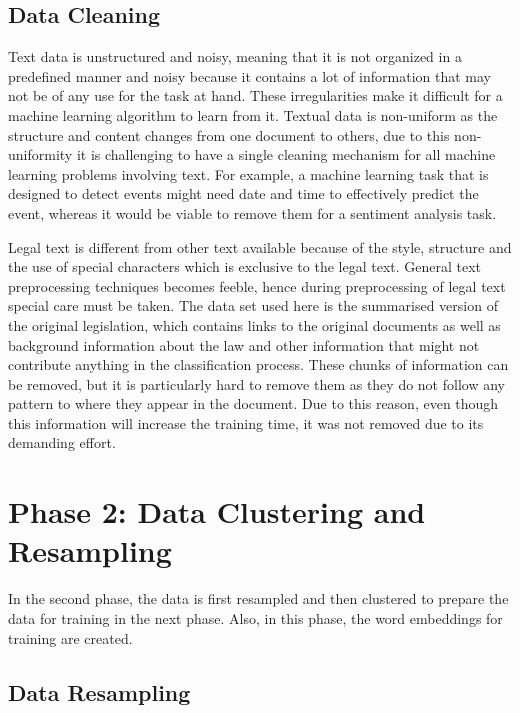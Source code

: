 \subsection*{Data Cleaning}\label{ConceptCleaning}

Text data is unstructured and noisy, meaning that it is not organized in a predefined manner and noisy because it contains a lot of information that may not be of any use for the task at hand. These irregularities make it difficult for a machine learning algorithm to learn from it. Textual data is non-uniform as the structure and content changes from one document to others, due to this non-uniformity it is challenging to have a single cleaning mechanism for all machine learning problems involving text. For example, a machine learning task that is designed to detect events might need date and time to effectively predict the event, whereas it would be viable to remove them for a sentiment analysis task.

Legal text is different from other text available because of the style, structure \cite{boella2011using} and the use of special characters which is exclusive to the legal text. General text preprocessing techniques becomes feeble, hence during preprocessing of legal text special care must be taken. The data set used here is the summarised version of the original legislation, which contains links to the original documents as well as background information about the law and other information that might not contribute anything in the classification process. These chunks of information can be removed, but it is particularly hard to remove them as they do not follow any pattern to where they appear in the document. Due to this reason, even though this information will increase the training time, it was not removed due to its demanding effort.

\section{Phase 2: Data Clustering and Resampling}
In the second phase, the data is first resampled and then clustered to prepare the data for training in the next phase. Also, in this phase, the word embeddings for training are created.

\subsection*{Data Resampling}


